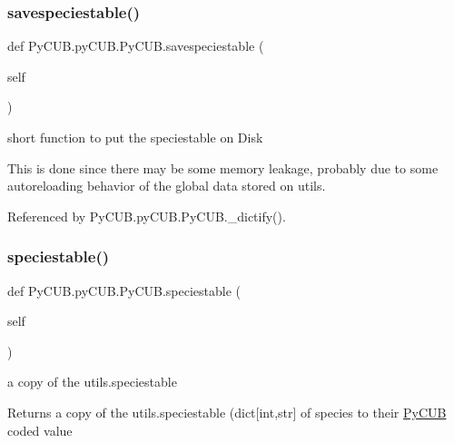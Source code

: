 \mbox{\label{class_py_c_u_b_1_1py_c_u_b_1_1_py_c_u_b_a8249834e1d2f7d061ae06ffa5a1adc32}} 
\subsubsection{\texorpdfstring{savespeciestable()}{savespeciestable()}}
{\footnotesize\ttfamily def Py\+C\+U\+B.\+py\+C\+U\+B.\+Py\+C\+U\+B.\+savespeciestable (\begin{DoxyParamCaption}\item[{}]{self }\end{DoxyParamCaption})}



short function to put the speciestable on Disk 

This is done since there may be some memory leakage, probably due to some autoreloading behavior of the global data stored on utils. 

Referenced by Py\+C\+U\+B.\+py\+C\+U\+B.\+Py\+C\+U\+B.\+\_\+dictify().

\mbox{\label{class_py_c_u_b_1_1py_c_u_b_1_1_py_c_u_b_af3e280c265200f13946e4bdcb4cd9dd0}} 
\subsubsection{\texorpdfstring{speciestable()}{speciestable()}}
{\footnotesize\ttfamily def Py\+C\+U\+B.\+py\+C\+U\+B.\+Py\+C\+U\+B.\+speciestable (\begin{DoxyParamCaption}\item[{}]{self }\end{DoxyParamCaption})}



a copy of the utils.\+speciestable 

\begin{DoxyReturn}{Returns}
a copy of the utils.\+speciestable (dict\mbox{[}int,str\mbox{]} of species to their \mbox{\hyperlink{class_py_c_u_b_1_1py_c_u_b_1_1_py_c_u_b}{Py\+C\+UB}} coded value 
\end{DoxyReturn}


